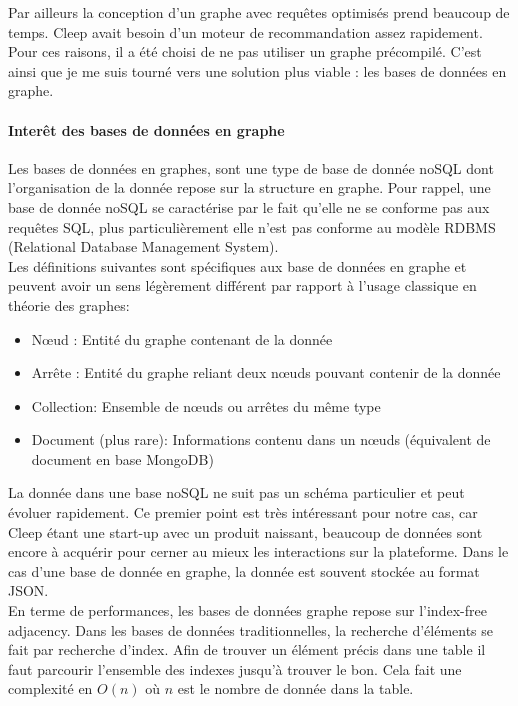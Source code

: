\documentclass{article} %
\begin{document}
Par ailleurs la conception d'un graphe avec requêtes optimisés prend beaucoup de temps. Cleep avait besoin d'un moteur de recommandation assez rapidement. Pour ces raisons, il a été choisi de ne pas utiliser un graphe précompilé. C'est ainsi que je me suis tourné vers une solution plus viable : les bases de données en graphe.

\paragraph{Interêt des bases de données en graphe\\}
Les bases de données en graphes, sont une type de base de donnée noSQL dont l'organisation de la donnée repose sur la structure en graphe. Pour rappel, une base de donnée noSQL se caractérise par le fait qu'elle ne se conforme pas aux requêtes SQL, plus particulièrement elle n'est pas conforme au modèle RDBMS (Relational Database Management System).\\
Les définitions suivantes sont spécifiques aux base de données en graphe et peuvent avoir un sens légèrement différent par rapport à l'usage classique en théorie des graphes:
\begin{itemize}
	 em
	\item Nœud : Entité du graphe contenant de la donnée
	\item Arrête : Entité du graphe reliant deux nœuds pouvant contenir de la donnée 
	\item Collection: Ensemble de nœuds ou arrêtes du même type
	\item Document (plus rare): Informations contenu dans un nœuds (équivalent de document en base MongoDB) 
\end{itemize}
La donnée dans une base noSQL ne suit pas un schéma particulier et peut évoluer rapidement. Ce premier point est très intéressant pour notre cas, car Cleep étant une start-up avec un produit naissant, beaucoup de données sont encore à acquérir pour cerner au mieux les interactions sur la plateforme. Dans le cas d'une base de donnée en graphe, la donnée est souvent stockée au format JSON.\\
En terme de performances, les bases de données graphe repose sur l'index-free adjacency. Dans les bases de données traditionnelles, la recherche d'éléments se fait par recherche d'index. Afin de trouver un élément précis dans une table il faut parcourir l'ensemble des indexes jusqu'à trouver le bon. Cela fait une complexité en $O(n)$ où $n$ est le nombre de donnée dans la table.\\
\end{document}
